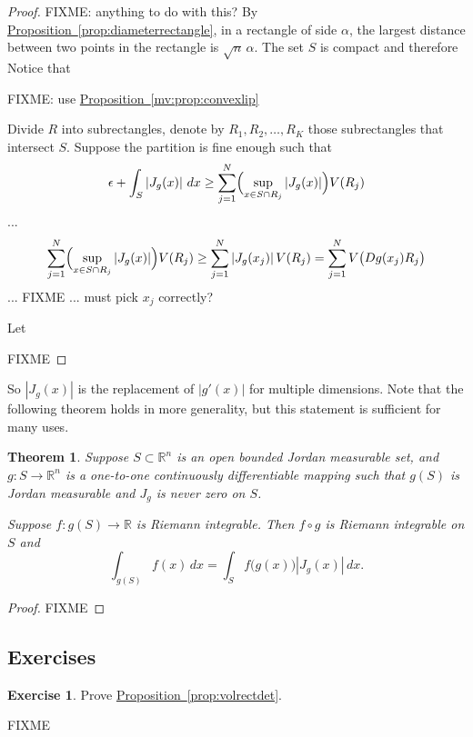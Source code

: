 \documentclass[12pt]{book}
\newcommand{\abs}[1]{\left\lvert {#1} \right\rvert}
\newcommand{\R}{{\mathbb{R}}}
\theoremstyle{plain}
\newtheorem{thm}{Theorem}[section]
\newtheorem{cor}[thm]{Corollary}
\theoremstyle{remark}
\theoremstyle{definition}
\theoremstyle{exercise}
\newtheorem{exercise}{Exercise}[section]
\theoremstyle{example}
\newcommand{\propref}[1]{\hyperref[#1]{Proposition~\ref*{#1}}}
\begin{document}
{\begin{proof}
FIXME: anything to do with this?
By \propref{prop:diameterrectangle},
in a rectangle of side $\alpha$, the largest distance 
between two points in the rectangle is $\sqrt{n} \, \alpha$.
The set $S$ is compact and therefore 
Notice that 

FIXME: use
\propref{mv:prop:convexlip}





Divide $R$ into
subrectangles, denote
by $R_1,R_2,\ldots,R_K$ those subrectangles that intersect $S$.
Suppose the partition is fine enough such that
\begin{equation*}
\epsilon + \int_S \abs{J_g(x)} \, dx \geq
\sum_{j=1}^N \Bigl(\sup_{x \in S \cap R_j} \abs{J_g(x)} \Bigr) V(R_j)
\end{equation*}
...
\begin{equation*}
\sum_{j=1}^N \Bigl(\sup_{x \in S \cap R_j} \abs{J_g(x)} \Bigr) V(R_j)
\geq
\sum_{j=1}^N \abs{J_g(x_j)}  V(R_j)
=
\sum_{j=1}^N V\bigl(Dg(x_j) R_j\bigr)
\end{equation*}
... FIXME ... must pick $x_j$ correctly?




Let 






FIXME
\end{proof}

So $\abs{J_g(x)}$ is the replacement of $\abs{g'(x)}$ for multiple
dimensions.  Note that the following theorem holds in more generality,
but this statement is sufficient for many uses.

\begin{thm}
Suppose $S \subset \R^n$ is an open bounded Jordan measurable set, and
$g \colon S \to \R^n$ is a one-to-one
continuously differentiable mapping such that
$g(S)$ is Jordan measurable and $J_g$ is never zero on $S$.

Suppose $f \colon g(S) \to \R$ is Riemann
integrable.  Then $f \circ g$ is Riemann integrable on $S$ and
\begin{equation*}
\int_{g(S)} f(x) \, dx = 
\int_S f\bigl(g(x)\bigr) \abs{J_g(x)} \, dx .
\end{equation*}
\end{thm}

\begin{proof}
FIXME
\end{proof}

%

\subsection{Exercises}

\begin{exercise}
Prove \propref{prop:volrectdet}.
\end{exercise}

FIXME


}
\end{document}
